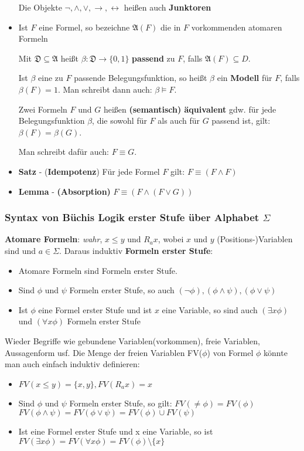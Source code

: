 \documentclass[12pt, a4paper]{article}
\begin{document}
\begin{itemize}
		\subitem Die Objekte $\neg,\wedge,\vee,\rightarrow,\leftrightarrow$ heißen auch \textbf{Junktoren}
		
		\item Ist $F$ eine Formel, so bezeichne $\mathfrak{A}(F)$ die in $F$ vorkommenden atomaren Formeln
		
		\subitem Mit $\mathfrak{D\subseteq A}$ heißt $\beta:\mathfrak{D}\rightarrow\{0,1\}$ \textbf{passend} zu $F$, falls $\mathfrak{A}(F)\subseteq D$.
		
		\subitem Ist $\beta$ eine zu $F$ passende Belegungsfunktion, so heißt $\beta$ ein \textbf{Modell} für $F$, falls $\beta(F)=1$. Man schreibt dann auch: $\beta\vDash F$.
		
		\subitem Zwei Formeln $F$ und $G$ heißen \textbf{(semantisch) äquivalent} gdw. für jede Belegungsfunktion $\beta$, die sowohl für $F$ als auch für $G$ passend ist, gilt: $\beta(F)=\beta(G)$.
		
		\subitem Man schreibt dafür auch: $F\equiv G$.
		
		\item \textbf{Satz} - (\textbf{Idempotenz}) Für jede Formel $F$ gilt: $F\equiv(F\wedge F)$
		
		\item \textbf{Lemma} - \textbf{(Absorption)} $F\equiv(F\wedge(F\vee G))$
	\end{itemize}
	
	\subsubsection{Syntax von Büchis Logik erster Stufe über Alphabet $\Sigma$}
	\textbf{Atomare Formeln}: \textit{wahr}, $x\leq y$ und $R_{a}x$, wobei $x$ und $y$ (Positions-)Variablen sind und $a\in\Sigma$. Daraus induktiv \textbf{Formeln erster Stufe}:
	\begin{itemize}
		\item Atomare Formeln sind Formeln erster Stufe.
		\item Sind $\phi$ und $\psi$ Formeln erster Stufe, so auch $(\neg\phi),(\phi\wedge\psi),(\phi\vee\psi)$
		\item Ist $\phi$ eine Formel erster Stufe und ist $x$ eine Variable, so sind auch $(\exists x\phi)$ und $(\forall x\phi)$ Formeln erster Stufe
	\end{itemize}
	
	Wieder Begriffe wie gebundene Variablen(vorkommen), freie Variablen, Aussagenform usf.
	Die Menge der freien Variablen FV($\phi$) von Formel $\phi$ könnte man auch einfach induktiv definieren:
	\begin{itemize}
		\item $FV(x\leq y) = \{x,y\}, FV(R_{a}x)={x}$
		\item Sind $\phi$ und $\psi$ Formeln erster Stufe, so gilt: 
			\subitem $FV(\neq\phi)=FV(\phi)$ 
			\subitem $FV(\phi\wedge\psi)= FV(\phi\vee\psi) = FV(\phi)\cup FV(\psi)$
		\item Ist eine Formel erster Stufe und x eine Variable, so ist $FV(\exists x\phi)=FV(\forall x\phi)=FV(\phi)\setminus\{x\}$
	\end{itemize}
	
\end{document}
